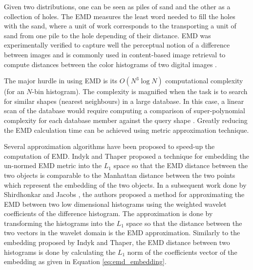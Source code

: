 \documentclass[10pt, conference, compsocconf]{IEEEtran}
\begin{document}
Given two distributions, one can be seen as piles of sand and the other as a collection of holes. 
The EMD measures the least word needed to fill the holes with the sand, where a unit of work corresponds to the transporting a unit of sand from one pile to the hole depending of their distance.
EMD was experimentally verified to capture well the perceptual notion of a difference between images and is commonly used in content-based image retrieval to compute distances between the color histograms of two digital images \cite{grauman2004fast}.

The major hurdle in using EMD is its $O\left( {{N^3}\log N} \right)$ computational complexity (for an $N$-bin histogram). 
The complexity is magnified when the task is to search for similar shapes (nearest neighbours) in a large database. 
In this case, a linear scan of the database would require computing a comparison of super-polynomial complexity for each database member against the query shape \cite{grauman2004fast}. 
Greatly reducing the EMD calculation time can be achieved using metric approximation technique.  

Several approximation algorithms have been proposed to speed-up the computation of EMD. 
Indyk and Thaper \cite{indyk2003fast} proposed a technique for embedding the un-normed EMD metric into the $L_1$ space so that the EMD distance between the two objects is comparable to the Manhattan distance between the two points which represent the embedding of the two objects.
In a subsequent work done by Shirdhonkar and Jacobs \cite{shirdhonkar2008approximate}, the authors proposed a method for approximating the EMD between two low dimensional histograms using the weighted wavelet coefficients of the difference histogram. 
The approximation is done by transforming the histograms into the $L_1$ space so that the distance between the two vectors in the wavelet domain is the EMD approximation. 
Similarly to the embedding proposed by Indyk and Thaper, the EMD distance between two histograms is done by calculating the $L_1$ norm of the coefficients vector of the embedding as given in Equation \ref{eq:emd_embedding}.
\end{document}
